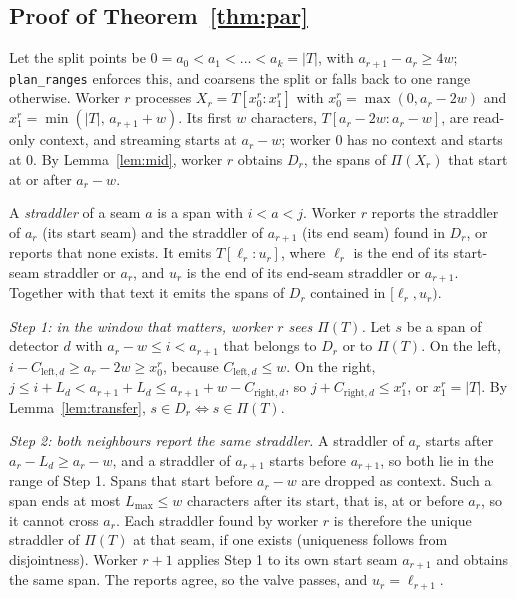 \subsection{Proof of Theorem~\ref{thm:par}}

Let the split points be $0 = a_0 < a_1 < \dots < a_k = |T|$, with $a_{r+1} - a_r \ge 4w$; \texttt{plan\_ranges} enforces this, and coarsens the split or falls back to one range otherwise. Worker $r$ processes $X_r = T[x_0^{r} : x_1^{r}]$ with $x_0^{r} = \max(0, a_r - 2w)$ and $x_1^{r} = \min(|T|,\, a_{r+1} + w)$. Its first $w$ characters, $T[a_r - 2w : a_r - w]$, are read-only context, and streaming starts at $a_r - w$; worker $0$ has no context and starts at $0$. By Lemma~\ref{lem:mid}, worker $r$ obtains $D_r$, the spans of $\Pi(X_r)$ that start at or after $a_r - w$.

A \emph{straddler} of a seam $a$ is a span with $i < a < j$. Worker $r$ reports the straddler of $a_r$ (its start seam) and the straddler of $a_{r+1}$ (its end seam) found in $D_r$, or reports that none exists. It emits $T[\ell_r : u_r]$, where $\ell_r$ is the end of its start-seam straddler or $a_r$, and $u_r$ is the end of its end-seam straddler or $a_{r+1}$. Together with that text it emits the spans of $D_r$ contained in $[\ell_r, u_r)$.

\emph{Step 1: in the window that matters, worker $r$ sees $\Pi(T)$.} Let $s$ be a span of detector $d$ with $a_r - w \le i < a_{r+1}$ that belongs to $D_r$ or to $\Pi(T)$. On the left, $i - C_{\mathrm{left},d} \ge a_r - 2w \ge x_0^{r}$, because $C_{\mathrm{left},d} \le w$. On the right, $j \le i + L_d < a_{r+1} + L_d \le a_{r+1} + w - C_{\mathrm{right},d}$, so $j + C_{\mathrm{right},d} \le x_1^{r}$, or $x_1^{r} = |T|$. By Lemma~\ref{lem:transfer}, $s \in D_r \Leftrightarrow s \in \Pi(T)$.

\emph{Step 2: both neighbours report the same straddler.} A straddler of $a_r$ starts after $a_r - L_d \ge a_r - w$, and a straddler of $a_{r+1}$ starts before $a_{r+1}$, so both lie in the range of Step 1. Spans that start before $a_r - w$ are dropped as context. Such a span ends at most $L_{\max} \le w$ characters after its start, that is, at or before $a_r$, so it cannot cross $a_r$. Each straddler found by worker $r$ is therefore the unique straddler of $\Pi(T)$ at that seam, if one exists (uniqueness follows from disjointness). Worker $r+1$ applies Step 1 to its own start seam $a_{r+1}$ and obtains the same span. The reports agree, so the valve passes, and $u_r = \ell_{r+1}$.

